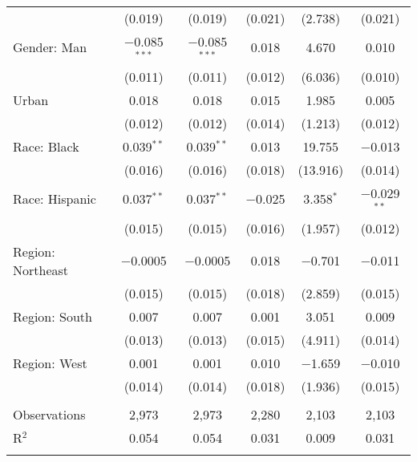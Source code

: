 \begin{tabular}{@{\extracolsep{5pt}}lccccc}
  & (0.019) & (0.019) & (0.021) & (2.738) & (0.021) \\ 
  Gender: Man & $-$0.085$^{***}$ & $-$0.085$^{***}$ & 0.018 & 4.670 & 0.010 \\ 
  & (0.011) & (0.011) & (0.012) & (6.036) & (0.010) \\ 
  Urban & 0.018 & 0.018 & 0.015 & 1.985 & 0.005 \\ 
  & (0.012) & (0.012) & (0.014) & (1.213) & (0.012) \\ 
  Race: Black & 0.039$^{**}$ & 0.039$^{**}$ & 0.013 & 19.755 & $-$0.013 \\ 
  & (0.016) & (0.016) & (0.018) & (13.916) & (0.014) \\ 
  Race: Hispanic & 0.037$^{**}$ & 0.037$^{**}$ & $-$0.025 & 3.358$^{*}$ & $-$0.029$^{**}$ \\ 
  & (0.015) & (0.015) & (0.016) & (1.957) & (0.012) \\ 
  Region: Northeast & $-$0.0005 & $-$0.0005 & 0.018 & $-$0.701 & $-$0.011 \\ 
  & (0.015) & (0.015) & (0.018) & (2.859) & (0.015) \\ 
  Region: South & 0.007 & 0.007 & 0.001 & 3.051 & 0.009 \\ 
  & (0.013) & (0.013) & (0.015) & (4.911) & (0.014) \\ 
  Region: West & 0.001 & 0.001 & 0.010 & $-$1.659 & $-$0.010 \\ 
  & (0.014) & (0.014) & (0.018) & (1.936) & (0.015) \\ 
 \hline \\[-1.8ex] 

Observations & 2,973 & 2,973 & 2,280 & 2,103 & 2,103 \\ 
R$^{2}$ & 0.054 & 0.054 & 0.031 & 0.009 & 0.031 \\ 
\hline 
\hline \\[-1.8ex] 
\end{tabular} 